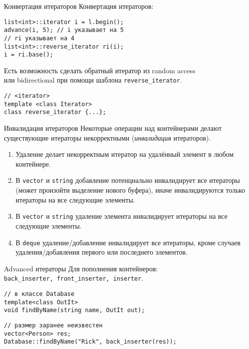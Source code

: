 \documentclass{beamer}
\begin{document}
\begin{frame}[fragile]{Конвертация итераторов}
Конвертация итераторов:
\begin{lstlisting}
list<int>::iterator i = l.begin();
advance(i, 5); // i указывает на 5
// ri указывает на 4
list<int>::reverse_iterator ri(i); 
i = ri.base();
\end{lstlisting}

Есть возможность сделать обратный итератор из random access\\ или bidirectional при помощи шаблона 
\texttt{reverse\_iterator}.
\begin{lstlisting}
// <iterator>
template <class Iterator> 
class reverse_iterator {...};
\end{lstlisting}
\end{frame}


\begin{frame}[fragile]{Инвалидация итераторов}
    Некоторые операции над контейнерами делают существующие итераторы
    некорректными (\emph{инвалидация} итераторов).
    
    \begin{enumerate}
        \item Удаление делает некорректным итератор на удалённый элемент в любом контейнере.
        \item В \texttt{vector} и \texttt{string}
            добавление потенциально инвалидирует все итераторы (может произойти выделение нового буфера), иначе инвалидируются только итераторы на все следующие элементы.
        \item В \texttt{vector} и \texttt{string} удаление элемента инвалидирует итераторы на все следующие элементы.
        \item В \texttt{deque} удаление/добавление инвалидирует все итераторы, кроме 
            случаев удаления/добавления первого или последнего элементов.
        
    \end{enumerate}
\end{frame}

\begin{frame}[fragile]{Advanced итераторы}
Для пополнения контейнеров:\\
{\tt back\_inserter, front\_inserter, inserter}.
\begin{lstlisting}
// в классе Database
template<class OutIt>
void findByName(string name, OutIt out);
\end{lstlisting}
\begin{lstlisting}
// размер заранее неизвестен
vector<Person> res; 
Database::findByName("Rick", back_inserter(res));
\end{lstlisting}
\end{frame}
\end{document}
